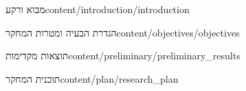 
  {מבוא ורקע}{content/introduction/introduction}

  {הגדרת הבעיה ומטרות המחקר}{content/objectives/objectives}

  {תוצאות מקדימות}{content/preliminary/preliminary_results}

  {תוכנית המחקר}{content/plan/research_plan}

